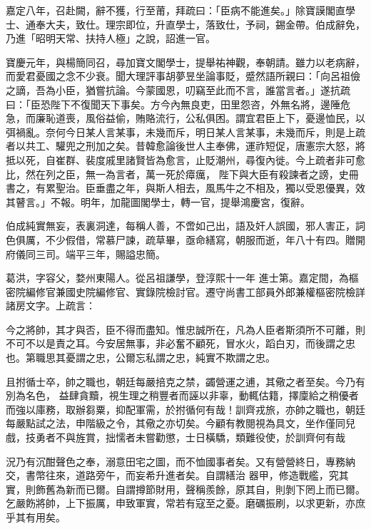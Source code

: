 \begin{pinyinscope}
 嘉定八年，召赴闕，辭不獲，行至莆，拜疏曰：「臣病不能進矣。」除寶謨閣直學士、通奉大夫，致仕。理宗即位，升直學士，落致仕，予祠，錫金帶。伯成辭免，乃進「昭明天常、扶持人極」之說，詔進一官。



 寶慶元年，與楊簡同召，尋加寶文閣學士，提舉祐神觀，奉朝請。雖力以老病辭，而愛君憂國之念不少衰。聞大理評事胡夢昱坐論事貶，蹙然語所親曰：「向呂祖儉之謫，吾為小臣，猶嘗抗論。今蒙國恩，叨竊至此而不言，誰當言者。」遂抗疏
 曰：「臣恐陛下不復聞天下事矣。方今內無良吏，田里怨咨，外無名將，邊陲危急，而廉恥道喪，風俗益偷，賄賂流行，公私俱困。謂宜君臣上下，憂邊恤民，以弭禍亂。奈何今日某人言某事，未幾而斥，明日某人言某事，未幾而斥，則是上疏者以共工、驩兜之刑加之矣。昔韓愈論後世人主奉佛，運祚短促，唐憲宗大怒，將抵以死，自崔群、裴度戚里諸賢皆為愈言，止貶潮州，尋復內徙。今上疏者非可愈比，然在列之臣，無一為言者，萬一死於瘴癘，
 陛下與大臣有殺諫者之謗，史冊書之，有累聖治。臣垂盡之年，與斯人相去，風馬牛之不相及，獨以受恩優異，效其瞽言。」不報。明年，加龍圖閣學士，轉一官，提舉鴻慶宮，復辭。



 伯成純實無妄，表裏洞達，每稱人善，不啻如己出，語及奸人誤國，邪人害正，詞色俱厲，不少假借，常慕尸諫，疏草畢，亟命繕寫，朝服而逝，年八十有四。贈開府儀同三司。端平三年，賜謚忠簡。



 葛洪，字容父，婺州東陽人。從呂祖謙學，登淳熙十一年
 進士第。嘉定間，為樞密院編修官兼國史院編修官、實錄院檢討官。遷守尚書工部員外郎兼權樞密院檢詳諸房文字。上疏言：



 今之將帥，其才與否，臣不得而盡知。惟忠誠所在，凡為人臣者斯須所不可離，則不可不以是責之耳。今安居無事，非必奮不顧死，冒水火，蹈白刃，而後謂之忠也。第職思其憂謂之忠，公爾忘私謂之忠，純實不欺謂之忠。



 且拊循士卒，帥之職也，朝廷每嚴掊克之禁，蠲營運之逋，其儆之者至矣。今乃有別為名色，
 益肆貪黷，視生理之稍豐者而誣以非辜，動輒估籍，擇廩給之稍優者而強以庫務，取辦芻粟，抑配軍需，於拊循何有哉！訓齊戎旅，亦帥之職也，朝廷每嚴點試之法，申階級之令，其儆之亦切矣。今顧有教閱視為具文，坐作僅同兒戲，技勇者不與旌賞，拙懦者未嘗勸懲，士日橫驕，類難役使，於訓齊何有哉



 況乃有沉酣聲色之奉，溺意田宅之圖，而不恤國事者矣。又有營營終日，專務納交，書幣往來，道路旁午，而妄希升進者矣。自謂繕治
 器甲，修造戰艦，究其實，則飾舊為新而已爾。自謂撙節財用，聲稱羨餘，原其自，則剝下罔上而已爾。乞嚴飭將帥，上下振厲，申致軍實，常若有寇至之憂。磨礪振刷，以求更新，亦庶乎其有用矣。




\end{pinyinscope}
